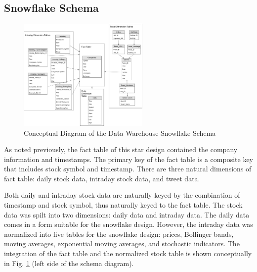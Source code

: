 \documentclass[journal]{IEEEtran}
\begin{document}
\subsection{Snowflake Schema}

\begin{figure}
	\centering
	\includegraphics[width=2.5in]{Snowflake_Conceptual_Schema.png}
	\caption{Conceptual Diagram of the Data Warehouse Snowflake Schema}
	\label{snowflake}
\end{figure}

As noted previously, the fact table of this star design contained the
 company information and timestamps.
The primary key of the fact table is a composite key that includes
 stock symbol and timestamp.
There are three natural dimensions of fact table: daily stock data,
 intraday stock data, and tweet data.

Both daily and intraday stock data are naturally keyed by the
 combination of timestamp and stock symbol,
 thus naturally keyed to the fact table.
The stock data was spilt into two dimensions: daily data and intraday data.
The daily data comes in a form suitable for the snowflake design.
However, the intraday data was normalized into five tables for the 
 snowflake design: prices, Bollinger bands, moving averages, exponential
 moving averages, and stochastic indicators.
The integration of the fact table and the normalized stock table is shown
 conceptually in Fig. \ref{snowflake} (left side of the schema diagram).
\end{document}
